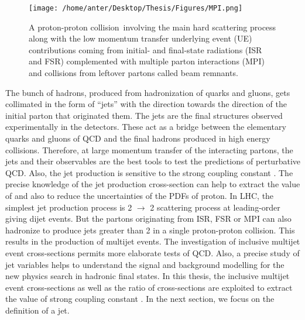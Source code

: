\begin{figure}[!h]
\begin{center}
\hspace*{-7mm}
\texttt{[image: /home/anter/Desktop/Thesis/Figures/MPI.png]}\\
\vspace*{4mm}
\caption[A proton-proton collision involving the main hard scattering process along with the low momentum transfer underlying event (UE) contributions.]{A proton-proton collision\footnotemark~involving the main hard scattering process along with the low momentum transfer underlying event (UE) contributions coming from initial- and final-state radiations (ISR and FSR) complemented with multiple parton interactions (MPI) and collisions from leftover partons called beam remnants.}
\label{fig:MPI}
\end{center}
\end{figure}
The bunch of hadrons, produced from hadronization of quarks and gluons, gets collimated in the form of ``jets'' with the direction towards the direction of the initial parton that originated them. The jets are the final structures observed experimentally in the detectors. These act as a bridge between the elementary quarks and gluons of QCD and the final hadrons produced in high energy collisions. Therefore, at large momentum transfer of the interacting partons, the jets and their observables are the best tools to test the predictions of perturbative QCD. Also, the jet production is sensitive to the strong coupling constant \alpsns. The precise knowledge of the jet production cross-section can help to extract the value of \alps and also to reduce the uncertainties of the PDFs of proton. In LHC, the simplest jet production process is 2 $\rightarrow$ 2 scattering process at leading-order giving dijet events. But the partons originating from ISR, FSR or MPI can also hadronize to produce jets greater than 2 in a single proton-proton collision. This results in the production of multijet events. The investigation of inclusive multijet event cross-sections permits more elaborate tests of QCD. Also, a precise study of jet variables helps to understand the signal and background modelling for the new physics search in hadronic final states. In this thesis, the inclusive multijet event cross-sections as well as the ratio of cross-sections are exploited to extract the value of strong coupling constant \alps. In the next section, we focus on the definition of a jet.

